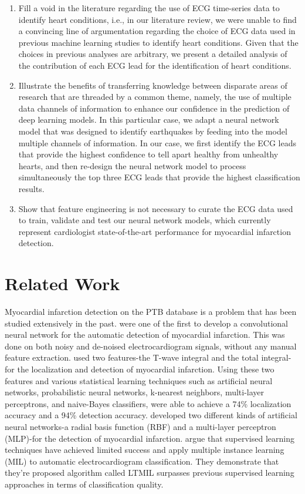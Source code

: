\documentclass{svproc}
\begin{document}
\begin{enumerate}
    \item Fill a void in the literature regarding the use of ECG time-series data to identify heart conditions, i.e., in our literature review, we were unable to find a convincing line of argumentation regarding the choice of ECG data used in previous machine learning studies to identify heart conditions. Given that the choices in previous analyses are arbitrary, we present a detailed analysis of the contribution of each ECG lead for the identification of heart conditions.
    \item Illustrate the benefits of transferring knowledge between disparate areas of research that are threaded by a common theme, namely, the use of multiple data channels of information to enhance our confidence in the prediction of deep learning models. In this particular case, we adapt a neural network model that was designed to identify earthquakes by feeding into the model multiple channels of information. In our case, we first identify the ECG leads that provide the highest confidence to tell apart healthy from unhealthy hearts, and then re-design the  neural network model to process simultaneously the top three ECG leads that provide the highest classification results.
    \item Show that feature engineering is not necessary to curate the ECG data used to train, validate and test our neural network models, which currently represent cardiologist state-of-the-art performance for myocardial infarction detection. 
\end{enumerate}

\section{Related Work}

Myocardial infarction detection on the PTB database is a problem that has been studied extensively in the past. \cite{acharya} were one of the first to develop a convolutional neural network for the automatic detection of myocardial infarction. This was done on both noisy and de-noised electrocardiogram signals, without any manual feature extraction. \cite{safdarian} used two features-the T-wave integral and the total integral-for the localization and detection of myocardial infarction. Using these two features and various statistical learning techniques such as artificial neural networks, probabilistic neural networks, k-nearest neighbors, multi-layer perceptrons, and naive-Bayes classifiers, \cite{safdarian} were able to achieve a 74\% localization accuracy and a 94\% detection accuracy. \cite{kojuri} developed two different kinds of artificial neural networks-a radial basis function (RBF) and a multi-layer perceptron (MLP)-for the detection of myocardial infarction. \cite{sun} argue that supervised learning techniques have achieved limited success and apply multiple instance learning (MIL) to automatic electrocardiogram classification. They demonstrate that they're proposed algorithm called LTMIL surpasses previous supervised learning approaches in terms of classification quality. 
\end{document}
